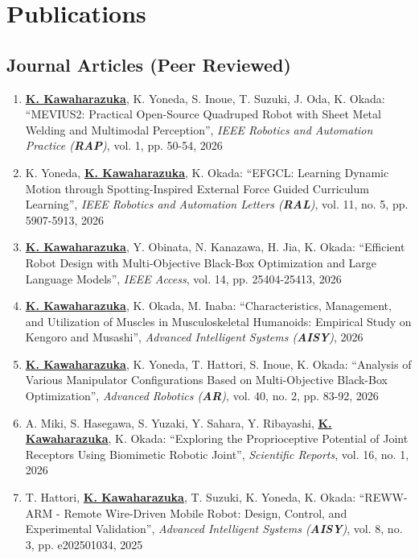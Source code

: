 \documentclass[letterpaper,11pt]{article}
\begin{document}
\section*{Publications}

\subsection*{Journal Articles (Peer Reviewed)}

\begin{enumerate}
\item \underline{\textbf{K. Kawaharazuka}}, K. Yoneda, S. Inoue, T. Suzuki, J. Oda, K. Okada: ``MEVIUS2: Practical Open-Source Quadruped Robot with Sheet Metal Welding and Multimodal Perception'', \textit{IEEE Robotics and Automation Practice (\textit{\textbf{RAP}})}, vol. 1, pp. 50-54, 2026
\item K. Yoneda, \underline{\textbf{K. Kawaharazuka}}, K. Okada: ``EFGCL: Learning Dynamic Motion through Spotting-Inspired External Force Guided Curriculum Learning'', \textit{IEEE Robotics and Automation Letters (\textit{\textbf{RAL}})}, vol. 11, no. 5, pp. 5907-5913, 2026
\item \underline{\textbf{K. Kawaharazuka}}, Y. Obinata, N. Kanazawa, H. Jia, K. Okada: ``Efficient Robot Design with Multi-Objective Black-Box Optimization and Large Language Models'', \textit{IEEE Access}, vol. 14, pp. 25404-25413, 2026
\item \underline{\textbf{K. Kawaharazuka}}, K. Okada, M. Inaba: ``Characteristics, Management, and Utilization of Muscles in Musculoskeletal Humanoids: Empirical Study on Kengoro and Musashi'', \textit{Advanced Intelligent Systems (\textit{\textbf{AISY}})}, 2026
\item \underline{\textbf{K. Kawaharazuka}}, K. Yoneda, T. Hattori, S. Inoue, K. Okada: ``Analysis of Various Manipulator Configurations Based on Multi-Objective Black-Box Optimization'', \textit{Advanced Robotics (\textit{\textbf{AR}})}, vol. 40, no. 2, pp. 83-92, 2026
\item A. Miki, S. Hasegawa, S. Yuzaki, Y. Sahara, Y. Ribayashi, \underline{\textbf{K. Kawaharazuka}}, K. Okada: ``Exploring the Proprioceptive Potential of Joint Receptors Using Biomimetic Robotic Joint'', \textit{Scientific Reports}, vol. 16, no. 1, 2026
\item T. Hattori, \underline{\textbf{K. Kawaharazuka}}, T. Suzuki, K. Yoneda, K. Okada: ``REWW-ARM - Remote Wire-Driven Mobile Robot: Design, Control, and Experimental Validation'', \textit{Advanced Intelligent Systems (\textit{\textbf{AISY}})}, vol. 8, no. 3, pp. e202501034, 2025

\end{enumerate}
\end{document}
